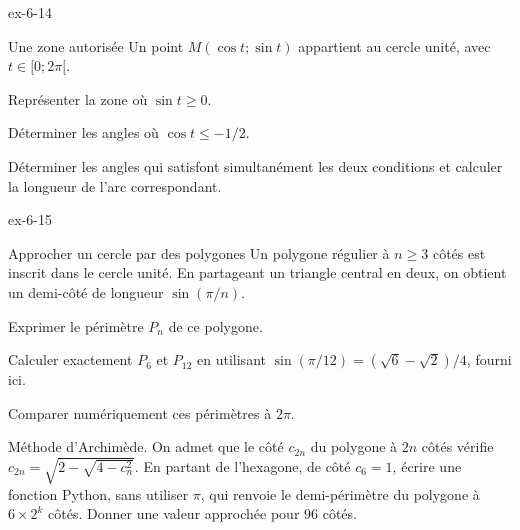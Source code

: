 \begin{blocLivre}{ex-6-14}
\begin{exercice}[3]{Une zone autorisée}
Un point $M(\cos t;\sin t)$ appartient au cercle unité, avec $t\in[0;2\pi[$.\begin{questions}
\item Représenter la zone où $\sin t\geq0$.
\item Déterminer les angles où $\cos t\leq-1/2$.
\item Déterminer les angles qui satisfont simultanément les deux conditions et calculer la longueur de l’arc correspondant.
\end{questions}

\label{figgeo-06-14-ex}
\end{exercice}
\end{blocLivre}
\begin{blocLivre}{ex-6-15}
\begin{exercice}[3]{Approcher un cercle par des polygones}
Un polygone régulier à $n\geq3$ côtés est inscrit dans le cercle unité. En partageant un triangle central en deux, on obtient un demi-côté de longueur $\sin(\pi/n)$.\begin{questions}
\item Exprimer le périmètre $P_n$ de ce polygone.
\item Calculer exactement $P_6$ et $P_{12}$ en utilisant $\sin(\pi/12)=(\sqrt6-\sqrt2)/4$, fourni ici.
\item Comparer numériquement ces périmètres à $2\pi$.
\item Méthode d’Archimède. On admet que le côté $c_{2n}$ du polygone à $2n$ côtés vérifie $c_{2n}=\sqrt{2-\sqrt{4-c_n^2}}$. En partant de l’hexagone, de côté $c_6=1$, écrire une fonction Python, sans utiliser $\pi$, qui renvoie le demi-périmètre du polygone à $6\times2^k$ côtés. Donner une valeur approchée pour 96 côtés.
\end{questions}

\label{figgeo-06-15-ex}
\end{exercice}
\end{blocLivre}
